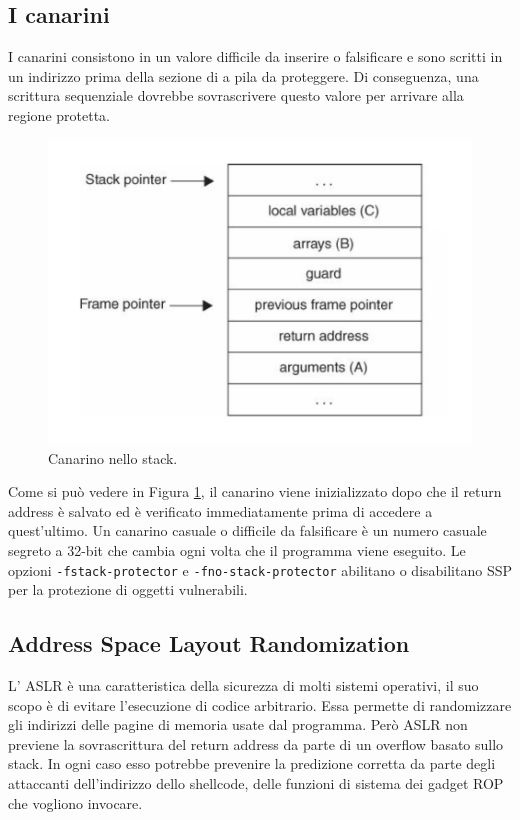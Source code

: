 \subsection{I canarini}
I canarini consistono in un valore difficile da inserire o falsificare e sono scritti in un indirizzo prima della sezione di a pila da proteggere.  Di conseguenza, una scrittura sequenziale dovrebbe sovrascrivere questo valore per arrivare alla regione protetta.
\begin{figure}[H]
    \centering
    \includegraphics[width=12cm, keepaspectratio]{capitoli/secure_coding/img/cap_3/canarini.png}
    \caption{Canarino nello stack.}\label{fig:canarini}
\end{figure}
Come si può vedere in Figura \ref{fig:canarini}, il canarino viene inizializzato dopo che il return address è salvato ed è verificato
immediatamente prima di accedere a quest'ultimo. Un canarino casuale o difficile da falsificare è un numero casuale segreto a 32-bit che cambia ogni
volta che il programma viene eseguito. Le opzioni \verb|-fstack-protector| e \verb|-fno-stack-protector| abilitano o disabilitano SSP per la protezione di
oggetti vulnerabili.

\subsection{Address Space Layout Randomization}
L' ASLR è una caratteristica della sicurezza di molti sistemi operativi, il suo scopo è di evitare l'esecuzione di codice arbitrario. Essa permette di randomizzare gli indirizzi delle pagine di memoria usate dal programma. Però ASLR non previene la sovrascrittura del return address da parte di un overflow basato sullo stack. In ogni caso esso potrebbe prevenire la predizione corretta da parte degli attaccanti dell'indirizzo dello shellcode, delle funzioni di sistema dei gadget ROP che vogliono invocare.


